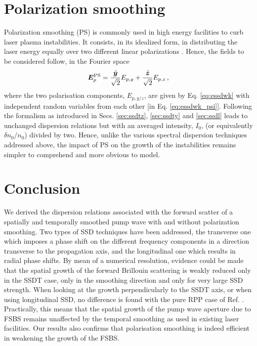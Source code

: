 \documentclass[
 reprint,
 amsmath,amssymb,
 aps,
]{revtex4-1}
\begin{document}
\section{Polarization smoothing}
Polarization smoothing (PS) is commonly used in high energy facilities to curb laser plasma instabilities. It consists, in its idealized form, in distributing the laser energy equally over two different linear polarizations \cite[]{PRL_Moody_2001,NatPhys_Glenzer,NatPhys_Labaune}. Hence, the fields to be considered follow, in the Fourier space
\begin{equation}
    \bm E_p^\mathrm{PS} = \frac{ \Hat{\bm y}}{\sqrt{2}} E_{p,y} +  \frac{ \Hat{\bm z}}{\sqrt{2}} E_{p,z}\, ,
\end{equation}
where the two polarisation components, $E_{p,y/z}$, are given by Eq. \eqref{eq:essdwk} with independent random variables from each other [in Eq. \eqref{eq:essdwk_psi}]. Following the formalism as introduced in Secs. \ref{sec:ssdtz}, \ref{sec:ssdty} and \ref{sec:ssdl} leads to unchanged dispersion relations but with an averaged intensity, $I_0$, (or equivalently $\delta n_0/n_0$) divided by two. Hence, unlike the various spectral dispersion techniques addressed above, the impact of PS on the growth of the instabilities remains simpler to comprehend and more obvious to model. 

\section{Conclusion}
We derived the dispersion relations associated with the forward scatter of a spatially and temporally smoothed pump wave with and without polarization smoothing. Two types of SSD techniques have been  addressed, the transverse one which imposes a phase shift on the different frequency components in a direction transverse to the propagation axis, and the longitudinal one which results in radial phase shifts. By mean of a numerical resolution, evidence could be made that the spatial growth of the forward Brillouin scattering is weakly reduced only in the SSDT case, only in the smoothing direction and only for very large SSD strength. When looking at the growth perpendicularly to the SSDT axis, or when using longitudinal SSD, no difference is found with the pure RPP case of Ref.  \cite[]{POP_Ruyer_2021}. Practically, this means that the spatial growth of the pump wave aperture due to FSBS remains unaffected by the temporal  smoothing as used in existing laser facilities. Our results also confirms  that polarisation smoothing is indeed efficient in weakening the growth of the FSBS. 
\end{document}
